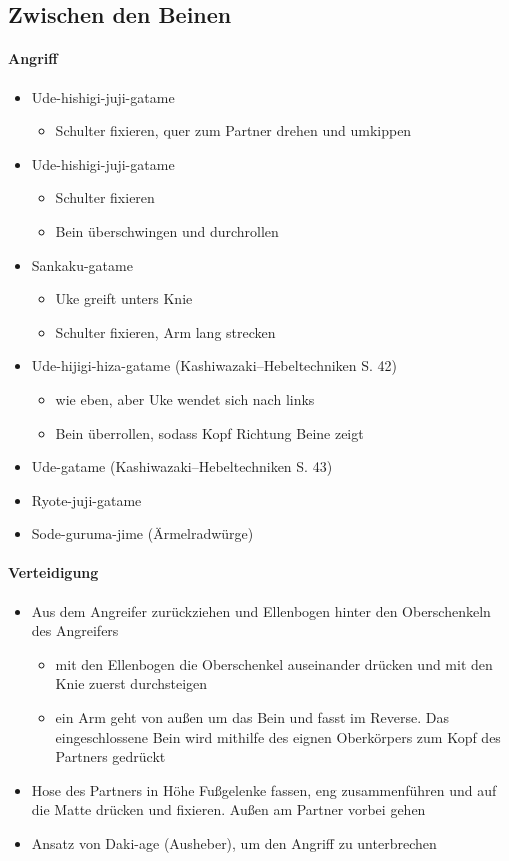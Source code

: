 \documentclass[justified, a4paper, notitlepage, captions=tableheading, nobib]{tufte-handout}
\begin{document}
\subsection{\label{orga527e99}Zwischen den Beinen }
\label{sec:orgae72a4b}
\paragraph{Angriff}
\label{sec:org448d7be}
\begin{itemize}
\item Ude-hishigi-juji-gatame
\begin{itemize}
\item Schulter fixieren, quer zum Partner drehen und umkippen
\end{itemize}
\item Ude-hishigi-juji-gatame
\begin{itemize}
\item Schulter fixieren
\item Bein überschwingen und durchrollen
\end{itemize}
\item Sankaku-gatame
\begin{itemize}
\item Uke greift unters Knie
\item Schulter fixieren, Arm lang strecken
\end{itemize}
\item Ude-hijigi-hiza-gatame (Kashiwazaki--Hebeltechniken S. 42)
\begin{itemize}
\item wie eben, aber Uke wendet sich nach links
\item Bein überrollen, sodass Kopf Richtung Beine zeigt
\end{itemize}
\item Ude-gatame (Kashiwazaki--Hebeltechniken S. 43)
\item Ryote-juji-gatame
\item Sode-guruma-jime (Ärmelradwürge)
\end{itemize}

\paragraph{Verteidigung}
\label{sec:orgd954e84}
\begin{itemize}
\item Aus dem Angreifer zurückziehen und Ellenbogen hinter den Oberschenkeln des Angreifers
\begin{itemize}
\item mit den Ellenbogen die Oberschenkel auseinander drücken und mit den Knie zuerst durchsteigen
\item ein Arm geht von außen um das Bein und fasst im Reverse. Das eingeschlossene Bein wird mithilfe des eignen Oberkörpers zum Kopf des Partners gedrückt
\end{itemize}
\item Hose des Partners in Höhe Fußgelenke fassen, eng zusammenführen und auf die Matte drücken und fixieren. Außen am Partner vorbei gehen
\item Ansatz von Daki-age (Ausheber), um den Angriff zu unterbrechen
\end{itemize}
\end{document}

